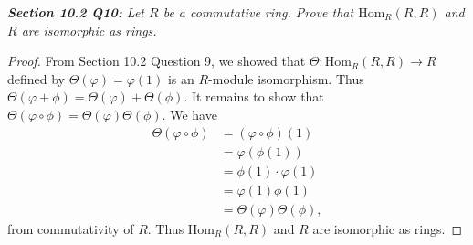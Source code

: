 \documentclass{article}
\begin{document}
\it \textbf{Section 10.2 Q10:} Let $R$ be a commutative ring. Prove that
  $\text{Hom}_R(R,R)$ and $R$ are isomorphic as rings.

  \begin{proof}
    From Section 10.2 Question 9, we showed that
    $\Theta:\text{Hom}_R(R,R)\rightarrow R$ defined by
    $\Theta(\varphi)=\varphi(1)$ is an $R$-module isomorphism. Thus
    $\Theta(\varphi+\phi)=\Theta(\varphi)+\Theta(\phi)$. It remains to show
    that $\Theta(\varphi\circ\phi)=\Theta(\varphi)\Theta(\phi)$. We have
    \begin{align*}
      \Theta(\varphi\circ\phi) &=(\varphi\circ\phi)(1) \\
      &=\varphi(\phi(1)) \\
      &=\phi(1)\cdot\varphi(1) \\
      &=\varphi(1)\phi(1) \\
      &=\Theta(\varphi)\Theta(\phi),
    \end{align*}
    from commutativity of $R$. Thus $\text{Hom}_R(R,R)$ and $R$ are
    isomorphic as rings.
  \end{proof}
\end{document}
